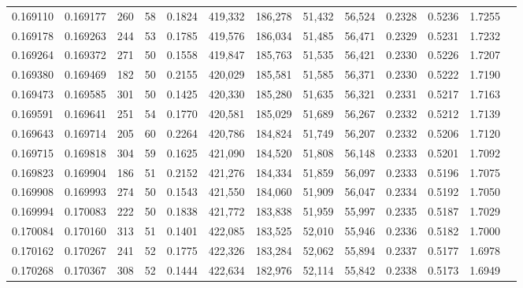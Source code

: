 \begin{tabular}{rrrrrrrrrrrrr}
0.169110 & 0.169177 &   260 &  58 &                                     0.1824 & 419,332 & 186,278 &  51,432 &  56,524 & 0.2328 & 0.5236 & 1.7255 \\
0.169178 & 0.169263 &   244 &  53 &                                     0.1785 & 419,576 & 186,034 &  51,485 &  56,471 & 0.2329 & 0.5231 & 1.7232 \\
0.169264 & 0.169372 &   271 &  50 &                                     0.1558 & 419,847 & 185,763 &  51,535 &  56,421 & 0.2330 & 0.5226 & 1.7207 \\
0.169380 & 0.169469 &   182 &  50 &                                     0.2155 & 420,029 & 185,581 &  51,585 &  56,371 & 0.2330 & 0.5222 & 1.7190 \\
0.169473 & 0.169585 &   301 &  50 &                                     0.1425 & 420,330 & 185,280 &  51,635 &  56,321 & 0.2331 & 0.5217 & 1.7163 \\
0.169591 & 0.169641 &   251 &  54 &                                     0.1770 & 420,581 & 185,029 &  51,689 &  56,267 & 0.2332 & 0.5212 & 1.7139 \\
0.169643 & 0.169714 &   205 &  60 &                                     0.2264 & 420,786 & 184,824 &  51,749 &  56,207 & 0.2332 & 0.5206 & 1.7120 \\
0.169715 & 0.169818 &   304 &  59 &                                     0.1625 & 421,090 & 184,520 &  51,808 &  56,148 & 0.2333 & 0.5201 & 1.7092 \\
0.169823 & 0.169904 &   186 &  51 &                                     0.2152 & 421,276 & 184,334 &  51,859 &  56,097 & 0.2333 & 0.5196 & 1.7075 \\
0.169908 & 0.169993 &   274 &  50 &                                     0.1543 & 421,550 & 184,060 &  51,909 &  56,047 & 0.2334 & 0.5192 & 1.7050 \\
0.169994 & 0.170083 &   222 &  50 &                                     0.1838 & 421,772 & 183,838 &  51,959 &  55,997 & 0.2335 & 0.5187 & 1.7029 \\
0.170084 & 0.170160 &   313 &  51 &                                     0.1401 & 422,085 & 183,525 &  52,010 &  55,946 & 0.2336 & 0.5182 & 1.7000 \\
0.170162 & 0.170267 &   241 &  52 &                                     0.1775 & 422,326 & 183,284 &  52,062 &  55,894 & 0.2337 & 0.5177 & 1.6978 \\
0.170268 & 0.170367 &   308 &  52 &                                     0.1444 & 422,634 & 182,976 &  52,114 &  55,842 & 0.2338 & 0.5173 & 1.6949 \\

\end{tabular}
